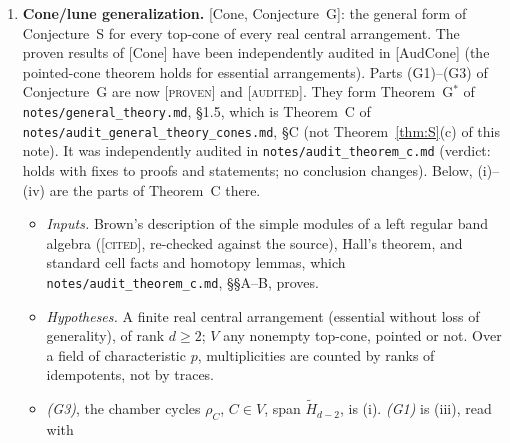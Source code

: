 \documentclass[11pt]{article}
\theoremstyle{definition}
\theoremstyle{remark}
\newcommand{\Sh}{\operatorname{Sh}}
\newcommand{\st}[1]{\textup{[\textsc{#1}]}}
\newcommand{\src}[1]{\nolinkurl{#1}}
\begin{document}
\begin{enumerate}
{  $n\ge7$: resolved.} In the braid arrangement, Prop.~B of
  \src{notes/audit_general_theory_cones.md}, \S C (the kernel of
  $C\mapsto\rho_C$ is the span of the non-singleton lunes, which is $\Sh_n$)
  is Prop.~$\Phi$ for every $n$, up to a global sign $c_n=\pm1$ depending
  only on $n$ (\src{notes/audit_theorem_c.md}, \S\S C.2--C.3; \st{proven}).
  Prop.~B uses Brown's theorem (item~4), Folkman's theorem and the cell
  facts, and neither Wachs's comb basis nor Ree's theorem. So Prop.~$\Phi$,
  in both directions, is \st{proven} for every $n$ given Brown, and
  Theorem~\ref{thm:S}(c)--(d) no longer depend on the cited Wachs
  statements. This derivation is the audit's own and has not had a second
  independent audit. A direct chain-level proof remains of interest: run the
  induction of Theorem~\ref{thm:S}(a) on chains, by making precise the
  heuristic that $E_{a,x}$ is the $\Phi$-image of taking the link at the
  atom $\pi_{a,x}$ ([AudS, \S E.4]).
\item \textbf{Cone/lune generalization.} [Cone, Conjecture~G]: the general
  form of Conjecture~S for every top-cone of every real central arrangement.
  The proven results of [Cone] have been independently audited in [AudCone]
  (the pointed-cone theorem holds for essential arrangements). Parts
  (G1)--(G3) of Conjecture~G are now \st{proven} and \st{audited}. They form
  Theorem~G$^*$ of \src{notes/general_theory.md}, \S1.5, which is Theorem~C
  of \src{notes/audit_general_theory_cones.md}, \S C (not
  Theorem~\ref{thm:S}(c) of this note). It was independently audited in
  \src{notes/audit_theorem_c.md} (verdict: holds with fixes to proofs and
  statements; no conclusion changes). Below, (i)--(iv) are the parts of
  Theorem~C there.
  \begin{itemize}[nosep]
  \item \emph{Inputs.} Brown's description of the simple modules of a left
    regular band algebra (\st{cited}, re-checked against the source), Hall's
    theorem, and standard cell facts and homotopy lemmas, which
    \src{notes/audit_theorem_c.md}, \S\S A--B, proves.
  \item \emph{Hypotheses.} A finite real central arrangement (essential
    without loss of generality), of rank $d\ge2$; $V$ any nonempty top-cone,
    pointed or not. Over a field of characteristic $p$, multiplicities are
    counted by ranks of idempotents, not by traces.
  \item \emph{(G3)}, the chamber cycles $\rho_C$, $C\in V$, span
    $\tilde H_{d-2}$, is (i). \emph{(G1)} is (iii), read with

\end{itemize}
\end{enumerate}
\end{document}
